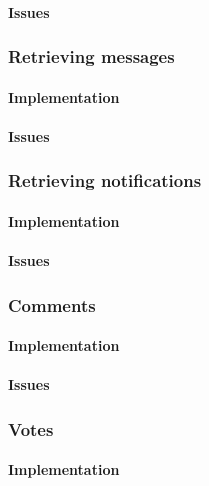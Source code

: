 \paragraph*{Issues}


\subsubsection*{Retrieving messages}

\paragraph*{Implementation}

\paragraph*{Issues}


\subsubsection*{Retrieving notifications}

\paragraph*{Implementation}

\paragraph*{Issues}


\subsubsection*{Comments}

\paragraph*{Implementation}

\paragraph*{Issues}


\subsubsection*{Votes}

\paragraph*{Implementation}

